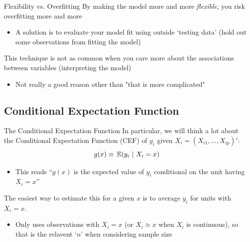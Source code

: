 \documentclass[aspectratio=169,t,11pt,table]{beamer}
\begin{document}
\begin{frame}{Flexibility vs. Overfitting}
  By making the model more and more \emph{flexible}, you risk overfitting more and more

  \begin{itemize}
    \item A solution is to evaluate your model fit using outside `testing data' (hold out some observations from fitting the model)
  \end{itemize}

  \pause
  \bigskip
  This technique is not as common when you care more about the associations between variables (interpreting the model)
  \begin{itemize}
    \item Not really a good reason other than "that is more complicated"
  \end{itemize}
\end{frame}


\subsection{Conditional Expectation Function}

\begin{frame}{The Conditional Expectation Function}
  In particular, we will think a lot about the \alert{Conditional Expectation Function} (CEF) of $y_i$ given $X_i = (X_{i1}, \dots, X_{ip})'$:
  $$
    g(x) \equiv \expec{y_i}{X_i = x}
  $$
  \begin{itemize}
    \item This reads ``$g(x)$ is the expected value of $y_i$ conditional on the unit having $X_i = x$''
  \end{itemize}

  \pause
  \bigskip
  The easiest way to estimate this for a given $x$ is to average $y_i$ for units with $X_i = x$. 
  \pause
  \begin{itemize}
    \item Only uses observations with $X_i = x$ (or $X_i \approx x$ when $X_i$ is continuous), so that is the relavent `$n$' when considering sample size
  \end{itemize}
\end{frame}

\end{document}
